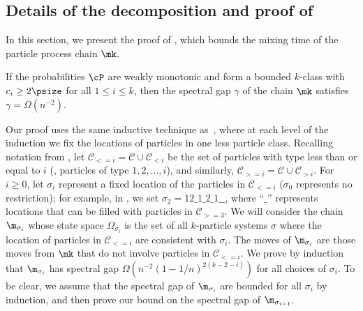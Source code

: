 %
%
\subsection{Details of the decomposition and proof of }
\label{sec:mk}

In this section, we present the proof of , which bounds 
the mixing time of the particle process chain $\mk.$  

\begin{thm:mk}
If the probabilities $\cP$ are weakly monotonic and form a bounded 
$k$-class with  $c_i\geq 2\psize$ for all $1\leq i \leq k$, 
then the spectral gap $\gamma$ of the chain $\mk$ satisfies
\abovedisplayskip=3pt
\belowdisplayskip=3pt
$\gamma =\Omega(n^{-2}).$
\end{thm:mk}


Our proof uses the same inductive technique
as~\cite{MS}, where at each level of the induction we fix the
locations of particles in one less particle class.  
Recalling notation from , 
let $\mathcal{C}_{<= i} = \mathcal{C} \cup \mathcal{C}_{< i}$ 
be the set of particles with type less than or 
equal to $i$ (\ie,  particles of type $1, 2, \ldots, i$), and similarly,
$\mathcal{C}_{>= i} = \mathcal{C} \cup \mathcal{C}_{> i}$.  For $i\geq 0$, 
let $\sigma_i$ represent a fixed location of 
the particles in $\mathcal{C}_{<= i}$ ($\sigma_0$ represents 
no restriction); for example, in , we set 
$\sigma_{2} = 12\_1\_2\_1\_\_$, where ``$\_$'' represents  
locations that can be filled with particles in $\mathcal{C}_{>= 3}$. 
We will consider the chain $\m_{\sigma_{i}}$ whose state space 
$\Omega_{\sigma_i}$ is the set of all $k$-particle systems  $\sigma$ 
where the location of particles in $\mathcal{C}_{<= i}$ 
 are consistent with $\sigma_i$. 
The moves of $\m_{\sigma_{i}}$ are those moves from $\mk$ that 
do not involve particles in $\mathcal{C}_{<= i}$.
We prove by induction that 
$\m_{\sigma_{i}}$ has spectral gap $\Omega(n^{-2}(1-1/n)^{2(k-2-i)})$ 
for all choices of $\sigma_i$. To be clear, we assume that the spectral gap of
$\m_{\sigma_{i}}$ are bounded for all $\sigma_i$ by induction, and then 
prove our bound on the spectral gap of $\m_{\sigma_{i-1}}$.


